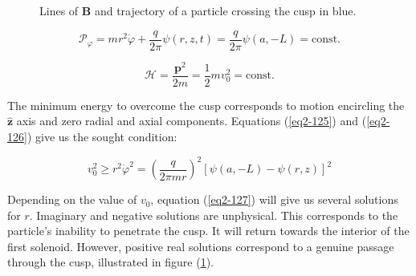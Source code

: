 \begin{figure}[H]
    \centering
    \scalebox{1}{}
    \vspace*{-2cm}
    \caption{Lines of $\mathbf{B}$ and trajectory of a particle crossing the cusp in blue.}
    \label{fig2-3}
\end{figure}

\begin{equation}
    \label{eq2-125}
    \mathcal{P}_\varphi=mr^2\dot{\varphi}+\frac{q}{2\pi}\psi(r,z,t)=\frac{q}{2\pi}\psi(a,-L)=\text{const.}
\end{equation}

\begin{equation}
    \label{eq2-126}
    \mathcal{H}=\frac{\mathbf{p}^2}{2m}=\frac{1}{2}mv_0^2=\text{const.}
\end{equation}

The minimum energy to overcome the cusp corresponds to motion encircling the $\mathbf{\hat{z}}$ axis and zero radial and axial components. Equations (\ref{eq2-125}) and (\ref{eq2-126}) give us the sought condition:

\begin{equation}
    \label{eq2-127}
    v_0^2\geq r^2\dot{\varphi}^2=\left(\frac{q}{2\pi mr}\right)^2\left[\psi(a,-L)-\psi(r,z)\right]^2
\end{equation}

Depending on the value of $v_0$, equation (\ref{eq2-127}) will give us several solutions for $r$. Imaginary and negative solutions are unphysical. This corresponds to the particle's inability to penetrate the cusp. It will return towards the interior of the first solenoid. However, positive real solutions correspond to a genuine passage through the cusp, illustrated in figure (\ref{fig2-3}).